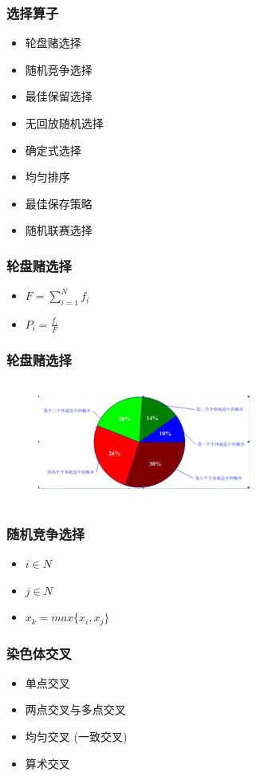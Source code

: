\documentclass[handout]{beamer}
\begin{document}
	\begin{frame}
		\frametitle{选择算子}
		\begin{itemize}
			\item 轮盘赌选择
			\item 随机竞争选择
			\item 最佳保留选择
			\item 无回放随机选择
			\item 确定式选择
			\item 均匀排序
			\item 最佳保存策略
			\item 随机联赛选择	
		\end{itemize}
	\end{frame}
	
	\begin{frame}
		\frametitle{轮盘赌选择}
		\begin{itemize}
			\item  $F=\sum_{i=1}^Nf_i$
			\item  $P_i=\frac{f_i}{F}$
		\end{itemize}
	\end{frame}
	
	\begin{frame}
		\frametitle{轮盘赌选择}
		\begin{figure}[htbp]
			\centering
			\includegraphics[width=7cm,height=4cm]{figure/4.png}
		\end{figure}
		\end{frame}
	
		\begin{frame}
			\frametitle{随机竞争选择}
			\begin{itemize}
				\item  $ i \in N$   
				\item  $ j \in N$
				\item  $x_k = max\{x_i,x_j\}$
			\end{itemize}
			\end{frame}
		
			\begin{frame}
				\frametitle{染色体交叉}
				\begin{itemize}
					\item 单点交叉
					\item 两点交叉与多点交叉
					\item 均匀交叉 (一致交叉)
					\item 算术交叉	
				\end{itemize}
			\end{frame}
			
\end{document}

